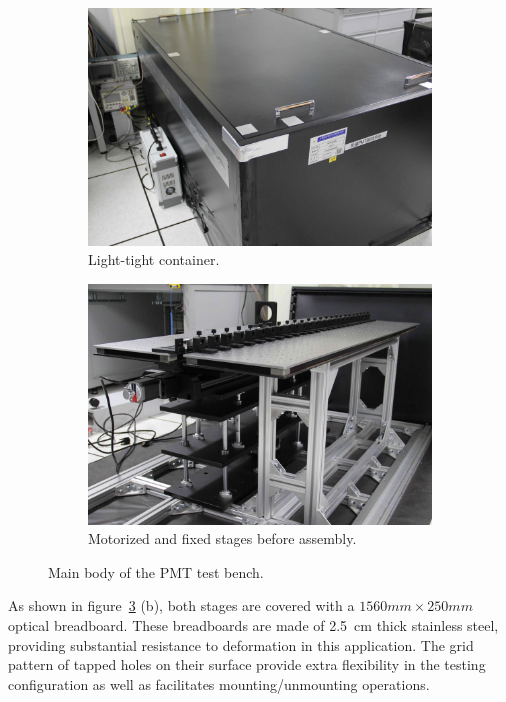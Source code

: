 \documentclass{JINST}
\begin{document}
\begin{figure}[tbp]
	
	\begin{subfigure}[t]{0.5\textwidth}
		\includegraphics[width=0.98\linewidth]{FIG2_a}
		\caption{Light-tight container.}
		\label{fig:FIG2_a}
	\end{subfigure}
	\begin{subfigure}[t]{0.5\textwidth}
		\includegraphics[width=0.98\linewidth]{FIG2_b}
		\caption{Motorized and fixed stages before assembly.}
		\label{fig:FIG2_b}
	\end{subfigure}
	
	\caption{Main body of the PMT test bench.}
	\label{fig:FIG2}
\end{figure}

As shown in figure~\ref{fig:FIG2} (b), both stages are covered with a $1560mm\times250mm$ optical breadboard. 
These breadboards are made of \SI{2.5}{cm} thick stainless steel, providing substantial resistance to deformation in this application. 
The grid pattern of tapped holes on their surface provide extra flexibility in the testing configuration as well as facilitates mounting/unmounting operations.
	
\end{document}
